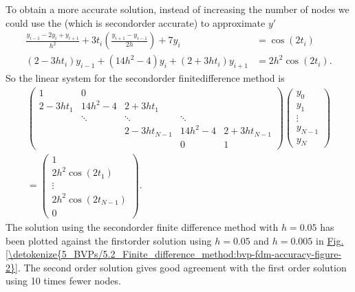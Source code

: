 \documentclass[letterpaper,10pt,english]{jupyterBook}
\begin{document}
\sphinxAtStartPar
To obtain a more accurate solution, instead of increasing the number of nodes we could use the {\hyperref[\detokenize{5_BVPs/5.2_Finite_difference_method:finite-difference-method-section}]{}} (which is second\sphinxhyphen{}order accurate) to approximate \(y'\)
\begin{align*}
    \frac{y_{i-1} - 2y_i + y_{i+1}}{h^2} + 3t_i\left( \frac{y_{i+1} - y_{i-1}}{2h} \right) + 7y_i &= \cos(2t_i) \\
    (2 - 3ht_i)y_{i-1} + (14h^2 - 4)y_i + (2 + 3ht_i)y_{i+1} &= 2h^2 \cos(2t_i).
\end{align*}
\sphinxAtStartPar
So the linear system for the second\sphinxhyphen{}order finite\sphinxhyphen{}difference method is
\begin{align*}
    \begin{pmatrix} 
        1 & 0 \\
        2 - 3ht_1 & 14h^2 - 4 & 2 + 3ht_1 \\
        & \ddots & \ddots & \ddots \\
        && 2 - 3ht_{N-1} & 14h^2 - 4 & 2 + 3ht_{N-1} \\
        &&& 0 & 1
    \end{pmatrix}
    \begin{pmatrix} y_0 \\ y_1 \\ \vdots \\ y_{N-1} \\ y_N \end{pmatrix} \\
    = \begin{pmatrix} 1 \\ 2h^2 \cos(2t_1) \\ \vdots \\ 2h^2 \cos(2t_{N-1}) \\ 0 \end{pmatrix}.
\end{align*}
\sphinxAtStartPar
The solution using the second\sphinxhyphen{}order finite difference method with \(h=0.05\) has been plotted against the first\sphinxhyphen{}order solution using \(h=0.05\) and \(h=0.005\) in \hyperref[\detokenize{5_BVPs/5.2_Finite_difference_method:bvp-fdm-accuracy-figure-2}]{Fig.\@ \ref{\detokenize{5_BVPs/5.2_Finite_difference_method:bvp-fdm-accuracy-figure-2}}}. The second order solution gives good agreement with the first order solution using 10 times fewer nodes.
\end{document}

